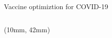 \begin{frame}{Vaccine optimiztion for COVID-19}
\begin{textblock*}{65mm}
{\begin{block}{%
                }
{\begin{equation*}
                    \end{equation*}
                }
            \end{block}
        }
    \end{textblock*}
    \begin{textblock*}{115mm}(10mm, 42mm)
    \end{textblock*}
\end{frame}
%
%
%
